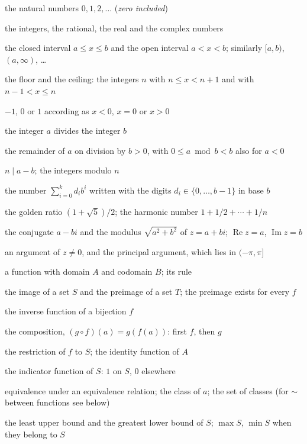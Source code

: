 \documentclass{sdbook-eng}
\begin{document}
\begin{symbols}
\item[$\mathbb N$] the natural numbers $0,1,2,\ldots$ (\emph{zero included})
\item[$\mathbb Z$, $\mathbb Q$, $\mathbb R$, $\mathbb C$] the integers, the rational, the real and the complex numbers
\item[{$[a,b]$, $(a,b)$}] the closed interval $a\le x\le b$ and the open interval $a<x<b$; similarly $[a,b)$, $(a,\infty)$, \ldots
\item[$\lfloor x\rfloor$, $\lceil x\rceil$] the floor and the ceiling: the integers $n$ with $n\le x<n+1$ and with $n-1<x\le n$
\item[$\operatorname{sign}x$] $-1$, $0$ or $1$ according as $x<0$, $x=0$ or $x>0$
\item[$a\mid b$] the integer $a$ divides the integer $b$
\item[$a\bmod b$] the remainder of $a$ on division by $b>0$, with $0\le a\bmod b<b$ also for $a<0$
\item[$a\equiv b\pmod n$, $\mathbb Z/n\mathbb Z$] $n\mid a-b$; the integers modulo $n$
\item[$(d_k\cdots d_0)_b$] the number $\sum_{i=0}^{k}d_ib^i$ written with the digits $d_i\in\{0,\ldots,b-1\}$ in base $b$
\item[$\phi$, $H_n$] the golden ratio $(1+\sqrt5)/2$; the harmonic number $1+1/2+\cdots+1/n$
\item[$\bar z$, $|z|$] the conjugate $a-bi$ and the modulus $\sqrt{a^2+b^2}$ of $z=a+bi$; $\operatorname{Re}z=a$, $\operatorname{Im}z=b$
\item[$\arg z$, $\operatorname{Arg}z$] an argument of $z\ne0$, and the principal argument, which lies in $(-\pi,\pi]$
\end{symbols}

\begin{symbols}
\item[$f\colon A\to B$, $a\mapsto f(a)$] a function with domain $A$ and codomain $B$; its rule
\item[$f(S)$, $f^{-1}(T)$] the image of a set $S$ and the preimage of a set $T$; the preimage exists for every $f$
\item[$f^{-1}$] the inverse function of a bijection $f$
\item[$g\circ f$] the composition, $(g\circ f)(a)=g(f(a))$: first $f$, then $g$
\item[$f|_S$, $\operatorname{id}_A$] the restriction of $f$ to $S$; the identity function of $A$
\item[$\mathbf 1_S$] the indicator function of $S$: $1$ on $S$, $0$ elsewhere
\item[$a\sim b$, {$[a]$}, $A/{\sim}$] equivalence under an equivalence relation; the class of $a$; the set of classes (for $\sim$ between functions see below)
\item[$\sup S$, $\inf S$] the least upper bound and the greatest lower bound of $S$; $\max S$, $\min S$ when they belong to $S$
\end{symbols}
\end{document}
